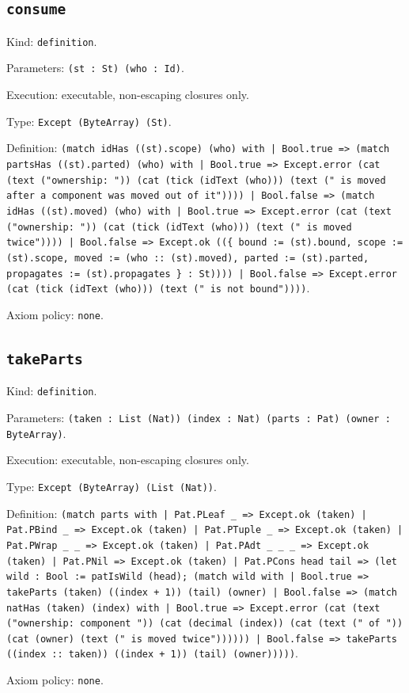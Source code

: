 \documentclass[11pt]{article}
\begin{document}
\subsection*{\texttt{consume}}
\noindent Kind: \texttt{definition}.\par
\noindent Parameters: \texttt{(st : St) (who : Id)}.\par
\noindent Execution: executable, non-escaping closures only.\par
\noindent Type: \texttt{Except (ByteArray) (St)}.\par
\noindent Definition: \texttt{(match idHas ((st).scope) (who) with | Bool.true => (match partsHas ((st).parted) (who) with | Bool.true => Except.error (cat (text ("ownership: ")) (cat (tick (idText (who))) (text (" is moved after a component was moved out of it")))) | Bool.false => (match idHas ((st).moved) (who) with | Bool.true => Except.error (cat (text ("ownership: ")) (cat (tick (idText (who))) (text (" is moved twice")))) | Bool.false => Except.ok ((\{ bound := (st).bound, scope := (st).scope, moved := (who :: (st).moved), parted := (st).parted, propagates := (st).propagates \} : St)))) | Bool.false => Except.error (cat (tick (idText (who))) (text (" is not bound"))))}.\par
\noindent Axiom policy: \texttt{none}.\par
\subsection*{\texttt{takeParts}}
\noindent Kind: \texttt{definition}.\par
\noindent Parameters: \texttt{(taken : List (Nat)) (index : Nat) (parts : Pat) (owner : ByteArray)}.\par
\noindent Execution: executable, non-escaping closures only.\par
\noindent Type: \texttt{Except (ByteArray) (List (Nat))}.\par
\noindent Definition: \texttt{(match parts with | Pat.PLeaf \_ => Except.ok (taken) | Pat.PBind \_ => Except.ok (taken) | Pat.PTuple \_ => Except.ok (taken) | Pat.PWrap \_ \_ => Except.ok (taken) | Pat.PAdt \_ \_ \_ => Except.ok (taken) | Pat.PNil => Except.ok (taken) | Pat.PCons head tail => (let wild : Bool := patIsWild (head); (match wild with | Bool.true => takeParts (taken) ((index + 1)) (tail) (owner) | Bool.false => (match natHas (taken) (index) with | Bool.true => Except.error (cat (text ("ownership: component ")) (cat (decimal (index)) (cat (text (" of ")) (cat (owner) (text (" is moved twice")))))) | Bool.false => takeParts ((index :: taken)) ((index + 1)) (tail) (owner)))))}.\par
\noindent Axiom policy: \texttt{none}.\par
\end{document}
